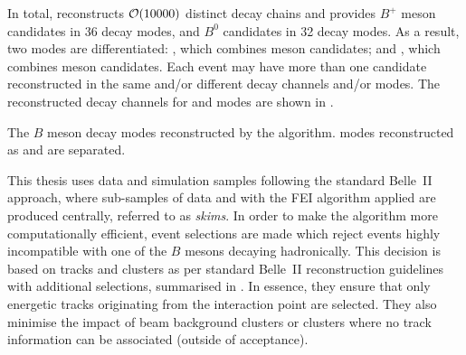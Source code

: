 In total, \FEI reconstructs ${\cal O}(10000)$ distinct decay chains and provides $B^+$ meson candidates in 36 decay modes, and $B^0$ candidates in 32 decay modes.
As a result, two \FEI modes are differentiated: 
\feiBp, which combines \Bpm meson candidates;
and \feiBz, which combines \Bz meson candidates.
Each event may have more than one candidate reconstructed in the same and/or different decay channels and/or \FEI modes.
The reconstructed decay channels for \feiBp and \feiBz modes are shown in .

\begin{table}
    \centering
    \caption{\label{tab:fei_modes}
    The $B$ meson decay modes reconstructed by the \FEI algorithm.
    \FEI modes reconstructed as \feiBp and \feiBz are separated.
    }
    
\end{table}


This thesis uses data and simulation samples following the standard Belle~II approach, where sub-samples of data and \MC with the FEI algorithm applied are produced centrally, referred to as \textit{\FEI skims}.
In order to make the \FEI algorithm more computationally efficient, event selections are made which reject events highly incompatible with one of the $B$ mesons decaying hadronically.
This decision is based on tracks and clusters as per standard Belle~II reconstruction guidelines with additional selections, summarised in .
In essence, they ensure that only energetic tracks originating from the interaction point are selected.
They also minimise the impact of beam background clusters or clusters where no track information can be associated (outside of \CDC acceptance).

\begin{table}[htbp!]
    \centering
     \caption{\label{tab:fei_objects} Definitions for objects used in \FEI selections.}
\end{table}

